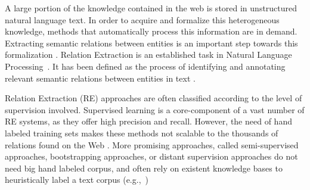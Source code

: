 

A large portion of the knowledge contained in the web is stored in unstructured natural language text. In order to acquire and formalize this heterogeneous knowledge, methods that automatically process this information are in demand. Extracting semantic relations between entities is an important step towards this formalization \citep{Wang2008}. Relation Extraction is an established task in Natural Language Processing~\citep{Bach2007}. It has been defined as the process of identifying and annotating relevant semantic relations between entities in text \citep{JiangZhai2007}. 

Relation Extraction (RE) approaches are often classified according to the level of supervision involved.
Supervised learning is a core-component of a vast number of RE systems, as they offer high precision and recall. However, the need of hand labeled training sets makes these methods not scalable to the thousands of relations found on the Web \citep{Hoffmann2011}.
More promising approaches, called semi-supervised approaches, bootstrapping approaches, or distant supervision approaches do not need big hand labeled corpus, and
often rely on existent knowledge bases to heuristically label a text corpus (e.g.,~\citep{Carlson2010,Hoffmann2011})

